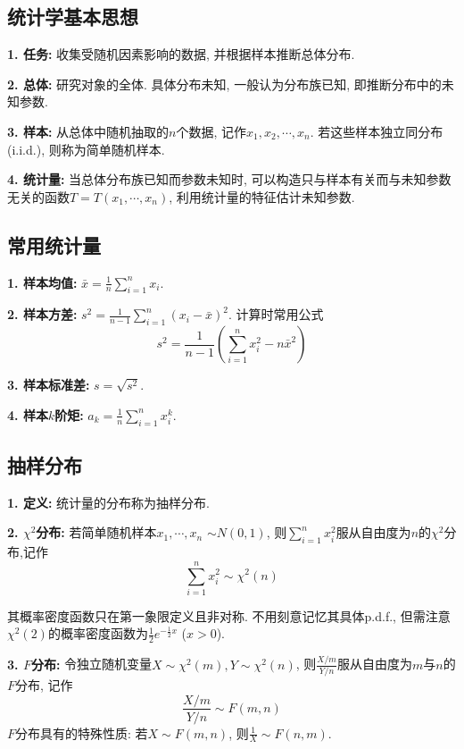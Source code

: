 \subsection{统计学基本思想}

\textbf{1. 任务: }收集受随机因素影响的数据, 并根据样本推断总体分布. 

\textbf{2. 总体: }研究对象的全体. 具体分布未知, 一般认为分布族已知, 即推断分布中的未知参数.

\textbf{3. 样本: }从总体中随机抽取的$n$个数据, 记作$x_1,x_2,\cdots,x_n$. 若这些样本独立同分布 (i.i.d.), 则称为简单随机样本.

\textbf{4. 统计量: }当总体分布族已知而参数未知时, 可以构造只与样本有关而与未知参数无关的函数$T=T(x_1,\cdots, x_n)$, 利用统计量的特征估计未知参数.

\subsection{常用统计量}

\textbf{1. 样本均值: }$\bar{x}=\frac{1}{n}\sum\limits_{i=1}^n x_i$.

\textbf{2. 样本方差: }$s^2=\frac{1}{n-1}\sum\limits_{i=1}^n (x_i-\bar{x})^2$. 计算时常用公式
\begin{equation*}
    s^2=\frac{1}{n-1}(\sum\limits_{i=1}^n x_i^2 - n\bar{x}^2)
\end{equation*}

\textbf{3. 样本标准差: }$s=\sqrt{s^2}$.

\textbf{4. 样本$k$阶矩: }$a_k=\frac{1}{n}\sum\limits_{i=1}^n x_i^k$.

\subsection{抽样分布}

\textbf{1. 定义: }统计量的分布称为抽样分布.

\textbf{2. $\chi^2$分布: }若简单随机样本$x_1,\cdots,x_n$ $\sim N(0,1)$, 则$\sum\limits_{i=1}^n x_i^2$服从自由度为$n$的$\chi^2$分布,记作
\begin{equation*}
    \sum\limits_{i=1}^n x_i^2 \sim \chi^2(n)
\end{equation*}

其概率密度函数只在第一象限定义且非对称. 不用刻意记忆其具体p.d.f., 但需注意$\chi^2(2)$的概率密度函数为$\frac{1}{2}e^{-\frac{1}{2}x}$ ($x>0$).

\textbf{3. $F$分布: }令独立随机变量$X \sim \chi^2(m), Y \sim \chi^2(n)$, 则$\frac{X/m}{Y/n}$服从自由度为$m$与$n$的$F$分布, 记作
\begin{equation*}
    \frac{X/m}{Y/n} \sim F(m,n)
\end{equation*}
$F$分布具有的特殊性质: 若$X \sim F(m,n)$, 则$\frac{1}{X} \sim F(n,m)$.

